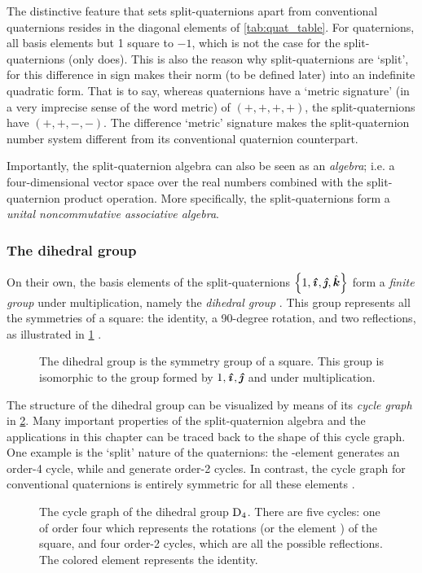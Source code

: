 The distinctive feature that sets split-quaternions apart from conventional quaternions resides in the diagonal elements of \cref{tab:quat_table}. For quaternions, all basis elements but 1 square to \(-1\), which is not the case for the split-quaternions (only \quati does). This is also the reason why split-quaternions are `split', for this difference in sign makes their norm (to be defined later) into an indefinite quadratic form. That is to say, whereas quaternions have a `metric signature' (in a very imprecise sense of the word metric) of \((+, +, +, +)\), the split-quaternions have \((+, +, -, -)\). The difference `metric' signature makes the split-quaternion number system different from its conventional quaternion counterpart.

Importantly, the split-quaternion algebra can also be seen as an \emph{algebra}; i.e. a four-dimensional vector space over the real numbers combined with the split-quaternion product operation. More specifically, the split-quaternions form a \emph{unital noncommutative associative algebra}.

\subsubsection{The dihedral group} 
On their own, the basis elements of the split-quaternions \(\qty{1, \quati, \quatj, \quatk}\) form a \emph{finite group} under multiplication, namely the \emph{dihedral group} . This group represents all the symmetries of a square: the identity, a 90-degree rotation, and two reflections, as illustrated in \cref{fig:square_symmetry} \cite{Dummit2004}.
\begin{figure}[ht!]
    \centering
    
    \caption{The dihedral group  is the symmetry group of a square. This group is isomorphic to the group formed by \(1, \quati, \quatj\) and \quatk under multiplication.}
    \label{fig:square_symmetry}
\end{figure}

The structure of the dihedral group can be visualized by means of its \emph{cycle graph} in \cref{fig:cycle_graph}. Many important properties of the split-quaternion algebra and the applications in this chapter can be traced back to the shape of this cycle graph. One example is the `split' nature of the quaternions: the \quati-element generates an order-4 cycle, while \quatj and \quatk generate order-2 cycles. In contrast, the cycle graph for conventional quaternions is entirely symmetric for all these elements \cite{Dummit2004}.
\begin{figure}[h!]
    \centering
    
    \caption{The cycle graph of the dihedral group $\mathrm{D}_4$. There are five cycles: one of order four which represents the rotations (or the element \quati) of the square, and four order-2 cycles, which are all the possible reflections. The colored element represents the identity.}
    \label{fig:cycle_graph}
\end{figure}

